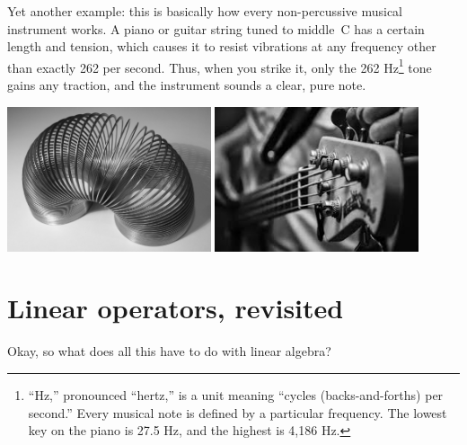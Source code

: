 Yet another example: this is basically how every non-percussive musical
instrument works. A piano or guitar string tuned to middle~C has a certain
length and tension, which causes it to resist vibrations at any frequency other
than exactly 262 per second. Thus, when you strike it, only the 262
Hz\footnote{``Hz,'' pronounced ``hertz,'' is a unit meaning ``cycles
(backs-and-forths) per second.'' Every musical note is defined by a particular
frequency. The lowest key on the piano is 27.5 Hz, and the highest is 4,186
Hz.} tone gains any traction, and the instrument sounds a clear, pure note.

\begin{center}
\label{slinky}
\includegraphics[width=0.45\textwidth]{slinky.jpg}
\quad
\includegraphics[width=0.45\textwidth]{guitar.jpg}
\end{center}

\section{Linear operators, revisited}


Okay, so what does all this have to do with linear algebra?
